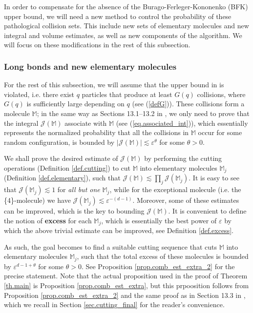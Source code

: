 \documentclass[10pt, reqno]{amsart}
\newcommand{\Mb}{\mathbb M}
\newcommand {\Jc}{\mathcal J}
\theoremstyle{definition}
\theoremstyle{remark}
\numberwithin{equation}{section}
\begin{document}
\begin{enumerate}
In order to compensate for the absence of the Burago-Ferleger-Kononenko (BFK) upper bound, we will need a new method to control the probability of these pathological collision sets. This include new sets of elementary molecules and new integral and volume estimates, as well as new components of the algorithm. We will focus on these modifications in the rest of this subsection.
\end{enumerate}
\subsubsection{Long bonds and new elementary molecules}\label{sec.LB} For the rest of this subsection, we will assume that the upper bound in \cite{BFK98} is violated, i.e. there exist $q$ particles that produce at least $G(q)$ collisions, where $G(q)$ is sufficiently large depending on $q$ (see (\ref{defG})). These collisions form a molecule $\Mb$; in the same way as Sections 13.1--13.2 in \cite{DHM24}, we only need to prove that the integral $\Jc(\Mb)$ associate with $\Mb$ (see (\ref{eq.associated_int})), which essentially represents the normalized probability that all the collisions in $\Mb$ occur for some random configuration, is bounded by $|\Jc(\Mb)|\lesssim \varepsilon^{\theta}$ for some $\theta>0$.

We shall prove the desired estimate of $\Jc(\Mb)$ by performing the cutting operations (Definition \ref{def.cutting}) to cut $\Mb$ into elementary molecules $\Mb_j$ (Definition \ref{def.elementary}), such that $\Jc(\Mb)\lesssim\prod_j\Jc(\Mb_j)$. It is easy to see that $\Jc(\Mb_j)\lesssim 1$ for \emph{all but one} $\Mb_j$, while for the exceptional molecule (i.e. the \{4\}-molecule) we have $\Jc(\Mb_j)\lesssim\varepsilon^{-(d-1)}$. Moreover, some of these estimates can be improved, which is the key to bounding $\Jc(\Mb)$. It is convenient to define the notion of \textbf{excess} for each $\Mb_j$, which is essentially the best power of $\varepsilon$ by which the above trivial estimate can be improved, see Definition \ref{def.excess}.

As such, the goal becomes to find a suitable cutting sequence that cuts $\Mb$ into elementary molecules $\Mb_j$, such that the total excess of these molecules is bounded by $\varepsilon^{d-1+\theta}$ for some $\theta>0$. See Proposition \ref{prop.comb_est_extra_2} for the precise statement. Note that the actual proposition used in the proof of Theorem \ref{th.main} is Proposition \ref{prop.comb_est_extra}, but this prpoosition follows from Proposition \ref{prop.comb_est_extra_2} and the same proof as in Section 13.3 in \cite{DHM24}, which we recall in Section \ref{sec.cutting_final} for the reader's convenience.
\end{document}
